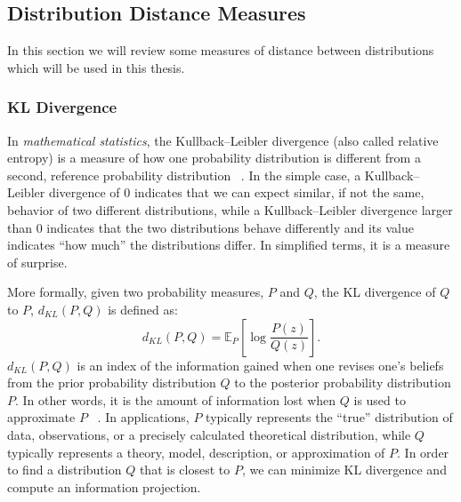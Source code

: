 \subsection{Distribution Distance Measures}
In this section we will review some  measures of distance between distributions which will be used in this thesis.
\subsubsection{KL Divergence}
In \emph{mathematical statistics}, the Kullback–Leibler divergence (also called relative entropy) is a measure of how one probability distribution is different from a second, reference probability distribution ~\cite{Kullback59}. In the simple case, a Kullback–Leibler divergence of 0 indicates that we can expect similar, if not the same, behavior of two different distributions, while a Kullback–Leibler divergence larger than 0 indicates that the two distributions behave differently and its value indicates ``how much'' the distributions differ. In simplified terms, it is a measure of surprise. 
\par More formally, given two probability measures, $P$ and $Q$, the KL divergence of $Q$ to $P$, $d_{KL}(P,Q)$ is defined as:
\begin{equation}
d_{KL}(P,Q)=\mathbb{E}_{P}\left[\log\frac{P(z)}{Q(z)}\right].
\end{equation}
$d_{KL}(P,Q)$ is an index of the information gained when one revises one's beliefs from the prior probability distribution $Q$ to the posterior probability distribution $P$. In other words, it is the amount of information lost when $Q$ is used to approximate $P$ ~\cite{BurnhamModelSelection}. In applications, $P$ typically represents the ``true'' distribution of data, observations, or a precisely calculated theoretical distribution, while $Q$ typically represents a theory, model, description, or approximation of $P$. In order to find a distribution $Q$ that is closest to $P$, we can minimize KL divergence and compute an information projection.
